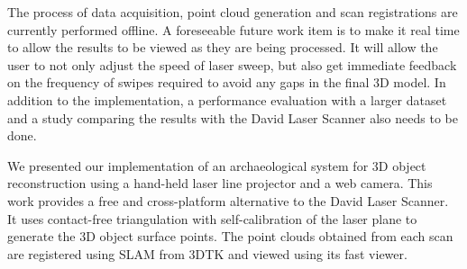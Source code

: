 The process of data acquisition, point cloud generation and scan registrations
are currently performed offline. A foreseeable future work item is to make it
real time to allow the results to be viewed as they are being processed. It
will allow the user to not only adjust the speed of laser sweep, but also get
immediate feedback on the frequency of swipes required to avoid any gaps in the
final 3D model. In addition to the implementation, a performance evaluation
with a larger dataset and a study comparing the results with the David Laser
Scanner also needs to be done.

We presented our implementation of an archaeological system for 3D object
reconstruction using a hand-held laser line projector and a web camera.  This
work provides a free and cross-platform alternative to the David Laser
Scanner. It uses contact-free triangulation with self-calibration of the laser
plane to generate the 3D object surface points. The point clouds obtained from
each scan are registered using \ac{SLAM} from \ac{3DTK} and viewed using its
fast viewer.
